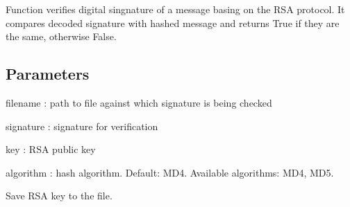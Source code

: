 \documentclass[letterpaper,10pt,english]{sphinxmanual}
\begin{document}
\begin{fulllineitems}
\label{\detokenize{todo_project_name:todo_project_name.rsa.rsa_verify_file}}
\pysigstartsignatures
{}
\pysigstopsignatures
\sphinxAtStartPar
Function verifies digital singnature of a message basing on the RSA protocol.
It compares decoded signature with hashed message
and returns True if they are the same, otherwise False.


\subsection{Parameters}
\label{\detokenize{todo_project_name:id10}}
\sphinxAtStartPar
filename
: path to file against which signature is being checked

\sphinxAtStartPar
signature
: signature for verification

\sphinxAtStartPar
key
: RSA public key

\sphinxAtStartPar
algorithm
: hash algorithm. Default: MD4.
Available algorithms: MD4, MD5.

\end{fulllineitems}


\begin{fulllineitems}
\label{\detokenize{todo_project_name:todo_project_name.rsa.save_key}}
\pysigstartsignatures
{}
\pysigstopsignatures
\sphinxAtStartPar
Save RSA key to the file.

\end{fulllineitems}
\end{document}
